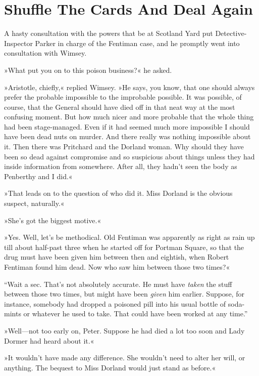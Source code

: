 \chapter{Shuffle The Cards And Deal Again}

\lettrine[lines=4]{A}{} hasty consultation with the powers that be at Scotland Yard put Detective-Inspector Parker in charge of the Fentiman case, and he promptly went into consultation with Wimsey.

»What put you on to this poison business?« he asked.

»Aristotle, chiefly,« replied Wimsey. »He says, you know, that one should always prefer the probable impossible to the improbable possible. It was possible, of course, that the General should have died off in that neat way at the most confusing moment. But how much nicer and more probable that the whole thing had been stage-managed. Even if it had seemed much more impossible I should have been dead nuts on murder. And there really was nothing impossible about it. Then there was Pritchard and the Dorland woman. Why should they have been so dead against compromise and so suspicious about things unless they had inside information from somewhere. After all, they hadn't seen the body as Penberthy and I did.«

»That leads on to the question of who did it. Miss Dorland is the obvious suspect, naturally.«

»She's got the biggest motive.«

»Yes. Well, let's be methodical. Old Fentiman was apparently as right as rain up till about half-past three when he started off for Portman Square, so that the drug must have been given him between then and eightish, when Robert Fentiman found him dead. Now who saw him between those two times?«

\enquote{Wait a sec. That's not absolutely accurate. He must have \textit{taken} the stuff between those two times, but might have been \textit{given} him earlier. Suppose, for instance, somebody had dropped a poisoned pill into his usual bottle of soda-mints or whatever he used to take. That could have been worked at any time.}

»Well\allowbreak---\allowbreak not too early on, Peter. Suppose he had died a lot too soon and Lady Dormer had heard about it.«

»It wouldn't have made any difference. She wouldn't need to alter her will, or anything. The bequest to Miss Dorland would just stand as before.«

